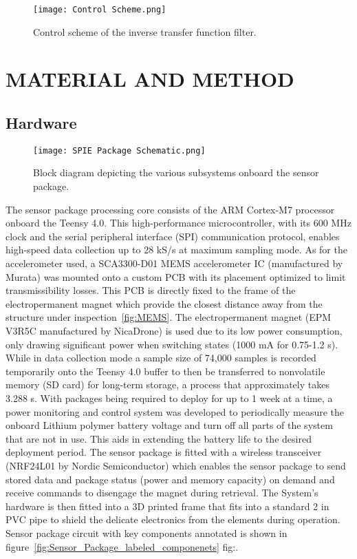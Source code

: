 \documentclass[]{spie}  %
\begin{document}
	\begin{figure} [H]
		\centering
		\texttt{[image: Control Scheme.png]}
		\caption{Control scheme of the inverse transfer function filter.}
		\label{fig:Control_Scheme}
	\end{figure} 	
	
	\section{MATERIAL AND METHOD}
		\subsection{Hardware}
		
		\begin{figure} [H]
			\centering
			\texttt{[image: SPIE Package Schematic.png]}
			\caption{Block diagram depicting the various subsystems onboard the sensor package.}
			\label{fig:SPIE Package Schematic}
		\end{figure}

	The sensor package processing core consists of the ARM Cortex-M7 processor onboard the Teensy 4.0. This high-performance microcontroller, with its 600 MHz clock and the serial peripheral interface (SPI) communication protocol, enables high-speed data collection up to 28 kS/s at maximum sampling mode. As for the accelerometer used, a SCA3300-D01 MEMS accelerometer IC (manufactured by Murata) was mounted onto a custom PCB with its placement optimized to limit transmissibility losses. This PCB is directly fixed to the frame of the electropermanent magnet which provide the closest distance away from the structure under inspection~\ref{fig:MEMS}. The electropermanent magnet (EPM V3R5C manufactured by NicaDrone) is used due to its low power consumption, only drawing significant power when switching states (1000 mA for 0.75-1.2 s). While in data collection mode a sample size of 74,000 samples is recorded temporarily onto the Teensy 4.0 buffer to then be transferred to nonvolatile memory (SD card) for long-term storage, a process that approximately takes 3.288 s. With packages being required to deploy for up to 1 week at a time, a power monitoring and control system was developed to periodically measure the onboard Lithium polymer battery voltage and turn off all parts of the system that are not in use. This aids in extending the battery life to the desired deployment period. The sensor package is fitted with a wireless transceiver (NRF24L01 by Nordic Semiconductor) which enables the sensor package to send stored data and package status (power and memory capacity) on demand and receive commands to disengage the magnet during retrieval. The System's hardware is then fitted into a 3D printed frame that fits into a standard 2 in PVC pipe to shield the delicate electronics from the elements during operation. Sensor package circuit with key components annotated is shown in figure~\ref{fig:Sensor_Package_labeled_componenets} fig:\cite{Carroll2021}.
\end{document}
